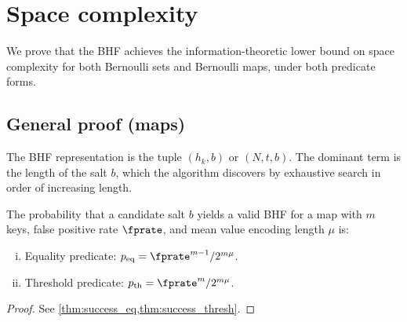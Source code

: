 \section{Space complexity}
\label{sec:space}

We prove that the BHF achieves the information-theoretic lower bound on space
complexity for both Bernoulli sets and Bernoulli maps, under both predicate
forms.

\subsection{General proof (maps)}

The BHF representation is the tuple $(h_k, b)$ or $(N, t, b)$.
The dominant term is the length of the salt $b$, which the algorithm discovers
by exhaustive search in order of increasing length.

\begin{theorem}
\label{thm:success_prob}
The probability that a candidate salt $b$ yields a valid BHF for a map with
$m$ keys, false positive rate $\fprate$, and mean value encoding length $\mu$
is:
\begin{enumerate}[(i)]
    \item Equality predicate: $p_{\mathrm{eq}} = \fprate^{m-1} / 2^{m\mu}$.
    \item Threshold predicate: $p_{\mathrm{th}} = \fprate^{m} / 2^{m\mu}$.
\end{enumerate}
\end{theorem}
\begin{proof}
See \cref{thm:success_eq,thm:success_thresh}.
\end{proof}

